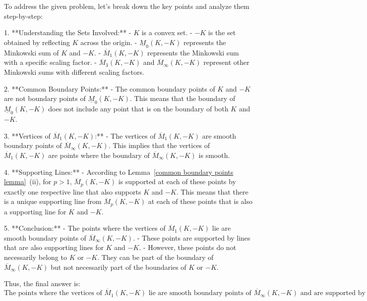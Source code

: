 To address the given problem, let's break down the key points and analyze them step-by-step:

1. **Understanding the Sets Involved:**
   - \( K \) is a convex set.
   - \( -K \) is the set obtained by reflecting \( K \) across the origin.
   - \( \underline{M}_0(K, -K) \) represents the Minkowski sum of \( K \) and \( -K \).
   - \( \overline{M}_1(K, -K) \) represents the Minkowski sum with a specific scaling factor.
   - \( \overline{M}_3(K, -K) \) and \( \overline{M}_\infty(K, -K) \) represent other Minkowski sums with different scaling factors.

2. **Common Boundary Points:**
   - The common boundary points of \( K \) and \( -K \) are not boundary points of \( \underline{M}_0(K, -K) \). This means that the boundary of \( \underline{M}_0(K, -K) \) does not include any point that is on the boundary of both \( K \) and \( -K \).

3. **Vertices of \( \overline{M}_1(K, -K) \):**
   - The vertices of \( \overline{M}_1(K, -K) \) are smooth boundary points of \( \overline{M}_\infty(K, -K) \). This implies that the vertices of \( \overline{M}_1(K, -K) \) are points where the boundary of \( \overline{M}_\infty(K, -K) \) is smooth.

4. **Supporting Lines:**
   - According to Lemma~\ref{common boundary points lemma}~(ii), for \( p > 1 \), \( \overline{M}_p(K, -K) \) is supported at each of these points by exactly one respective line that also supports \( K \) and \( -K \). This means that there is a unique supporting line from \( \overline{M}_p(K, -K) \) at each of these points that is also a supporting line for \( K \) and \( -K \).

5. **Conclusion:**
   - The points where the vertices of \( \overline{M}_1(K, -K) \) lie are smooth boundary points of \( \overline{M}_\infty(K, -K) \).
   - These points are supported by lines that are also supporting lines for \( K \) and \( -K \).
   - However, these points do not necessarily belong to \( K \) or \( -K \). They can be part of the boundary of \( \overline{M}_\infty(K, -K) \) but not necessarily part of the boundaries of \( K \) or \( -K \).

Thus, the final answer is:
\[
\boxed{\text{The points where the vertices of } \overline{M}_1(K, -K) \text{ lie are smooth boundary points of } \overline{M}_\infty(K, -K) \text{ and are supported by lines that are also supporting lines for } K \text{ and } -K, \text{ but they do not necessarily belong to } K \text{ or } -K.}
\]